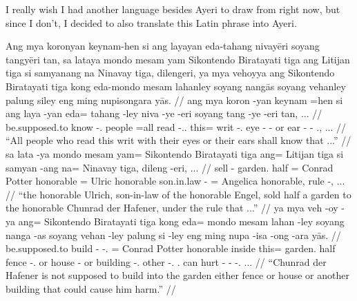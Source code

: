 \documentclass[12pt,paper=a4]{scrartcl}
\begin{document}
I really wish I had another language besides Ayeri to draw from right now, but 
since I don't, I decided to also translate this Latin phrase into Ayeri.


\pex
	\glpreamble Ang mya koronyan keynam-hen si ang layayan eda-tahang 
		nivayēri soyang tangyēri tan, sa lataya mondo mesam yam 
		Sikontendo Biratayati tiga ang Litijan tiga si samyanang na 
		Ninavay tiga, dilengeri, ya mya vehoyya ang Sikontendo 
		Biratayati tiga kong eda-mondo mesam lahanley soyang nangās 
		soyang vehanley palung siley eng ming nupisongara yās. //
	\a \begingl
		\gla ang mya koron -yan keynam =hen si ang laya -yan eda= tahang 
			-ley niva -ye -eri soyang tang -ye -eri tan, ... //
		\glb \AgtT{} be.supposed.to know -\Tpl{}.\M{} people =all \Rel{} 
			\AgtT{} read -\Tpl{}.\M{}.\Top{} this= writ 
			-\Parg{}.\Inan{} eye -\Pl{} -\Ins{} or ear -\Pl{} 
			-\Ins{} \Tpl{}.\Gen{}, ... //
		\glft \enquote{All people who read this writ with their eyes or 
			their ears shall know that ...} //
	\endgl
	\a \begingl
		\gla sa lata -ya mondo mesam yam= Sikontendo Biratayati tiga 
			ang= Litijan tiga si samyan -ang na= Ninavay tiga, 
			dileng -eri, ... //
		\glb \PatT{} sell -\Tsg{} garden.\Top{} half \Dat{}= Conrad 
			Potter honorable \Aarg{}= Ulric honorable \Rel{} 
			son.in.law -\Aarg{} \Gen{}= Angelica honorable, rule 
			-\Ins{}, ... //
		\glft \enquote{the honorable Ulrich, son-in-law of the honorable 
			Engel, sold half a garden to the honorable Chunrad der 
			Hafener, under the rule that ...} //
	\endgl
	\a \begingl
		\gla ya mya veh -oy -ya ang= Sikontendo Biratayati tiga kong 
			eda= mondo mesam lahan -ley soyang nanga -as soyang 
			vehan -ley palung si -ley eng ming nupa -isa -ong -ara 
			yās. //
		\glb \LocT{} be.supposed.to build -\Neg{} -\Tsg{}.\M{} \Aarg{}= 
			Conrad Potter honorable inside this= garden.\Top{} half 
			fence -\Parg{}.\Inan{} or house -\Parg{} or building 
			-\Parg{}.\Inan{} other \Rel{} -\Parg{}.\Inan{} 
			\Aarg{}.\Inan{} can hurt -\Caus{} -\Irr{} 
			-\Tsg{}.\Inan{} \Tsg{}.\M{}.\Parg{}. //
		\glft \enquote{Chunrad der Hafener is not supposed to build into 
		the garden either fence or house or another building that could 
		cause him harm.} //
	\endgl
\xe
\end{document}
